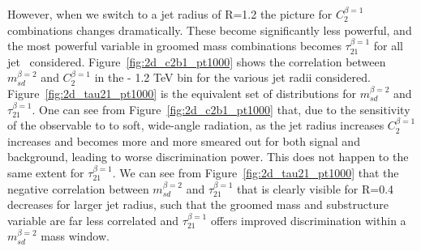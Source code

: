 However, when we switch to a jet radius of R=1.2 the picture for
$C_2^{\beta=1}$ combinations changes dramatically. These become
significantly less powerful, and the most powerful variable in groomed
mass combinations becomes $\tau_{21}^{\beta=1}$ for all jet
\pt~considered. Figure~\ref{fig:2d_c2b1_pt1000} shows the correlation between
$m_{sd}^{\beta=2}$ and $C_2^{\beta=1}$ in the  - 1.2 TeV bin for
the various jet radii considered. Figure~\ref{fig:2d_tau21_pt1000} is
the equivalent set of distributions for $m_{sd}^{\beta=2}$ and
$\tau_{21}^{\beta=1}$. One can see from
Figure~\ref{fig:2d_c2b1_pt1000} that, due to the sensitivity of the
observable to to soft, wide-angle radiation, as the jet radius increases
$C_2^{\beta=1}$ increases and becomes more and more smeared out for both signal and
background, leading to worse discrimination power. This does not
happen to the same extent for $\tau_{21}^{\beta=1}$. We can see from Figure~\ref{fig:2d_tau21_pt1000} that
the negative correlation between $m_{sd}^{\beta=2}$ and
$\tau_{21}^{\beta=1}$ that is clearly visible for R=0.4 decreases for
larger jet radius, such that the groomed mass and substructure variable
are far less correlated and $\tau_{21}^{\beta=1}$ offers improved
discrimination within a $m_{sd}^{\beta=2}$ mass window.



